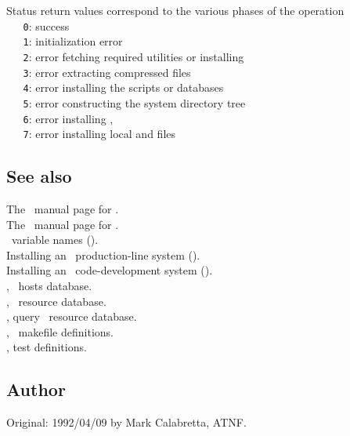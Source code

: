 Status return values correspond to the various phases of the operation
\\ \verb+   0+: success
\\ \verb+   1+: initialization error
\\ \verb+   2+: error fetching required utilities or installing 
\\ \verb+   3+: error extracting compressed  files
\\ \verb+   4+: error installing the  scripts or databases
\\ \verb+   5+: error constructing the system directory tree
\\ \verb+   6+: error installing , 
\\ \verb+   7+: error installing local  and  files

\subsection*{See also}

The \gnu\ manual page for .\\
The \gnu\ manual page for .\\
\aipspp\ variable names ().\\
Installing an \aipspp\ production-line system ().\\
Installing an \aipspp\ code-development system
   ().\\
, \aipspp\ hosts database.\\
, \aipspp\ resource database.\\
, query \aipspp\ resource database.\\
, \aipspp\ makefile definitions.\\
, test  definitions.

\subsection*{Author}

Original: 1992/04/09 by Mark Calabretta, ATNF.


\newpage
\section{}
\label{depend}

